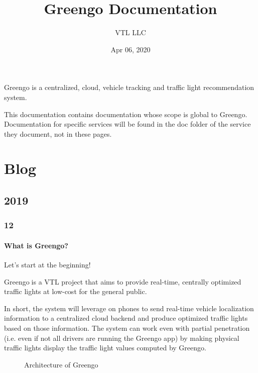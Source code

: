 \documentclass[letterpaper,10pt,english]{sphinxmanual}
\title{Greengo Documentation}
\date{Apr 06, 2020}
\author{VTL LLC}
\begin{document}
\pagestyle{empty}
\sphinxmaketitle
\pagestyle{plain}
\sphinxtableofcontents
\pagestyle{normal}
\label{\detokenize{index::doc}}


Greengo is a centralized, cloud, vehicle tracking and traffic light recommendation system.

This documentation contains documentation whose scope is global to Greengo.
Documentation for specific services will be found in the doc folder of the service they document, not in these pages.


\chapter{Blog}
\label{\detokenize{blog/index:blog}}\label{\detokenize{blog/index::doc}}

\section{2019}
\label{\detokenize{blog/2019/index:id1}}\label{\detokenize{blog/2019/index::doc}}

\subsection{12}
\label{\detokenize{blog/2019/12/index:id1}}\label{\detokenize{blog/2019/12/index::doc}}

\subsubsection{What is Greengo?}
\label{\detokenize{blog/2019/12/what_is_greengo:what-is-greengo}}\label{\detokenize{blog/2019/12/what_is_greengo::doc}}
Let’s start at the beginning!

Greengo🚦is a VTL project that aims to provide real-time, centrally optimized traffic lights at low-cost for the general public.

In short, the system will leverage on phones to send real-time vehicle localization information to a centralized cloud backend and produce optimized traffic lights based on those information. The system can work even with partial penetration (i.e. even if not all drivers are running the Greengo app) by making physical traffic lights display the traffic light values computed by Greengo.

\begin{figure}[htbp]
\centering
\capstart

\noindent{}
\caption{Architecture of Greengo}\label{\detokenize{blog/2019/12/what_is_greengo:id1}}\end{figure}
\end{document}
